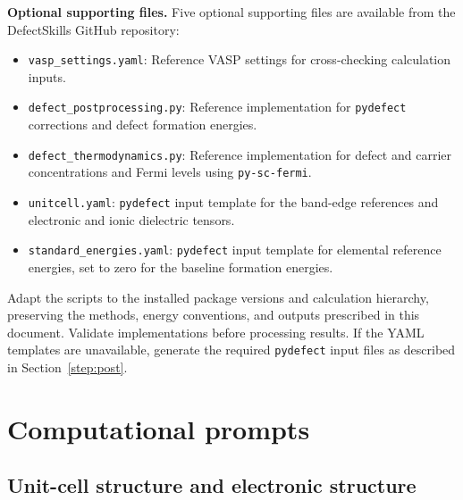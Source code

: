 \documentclass[aip,jap,reprint,amsmath,amssymb]{revtex4-2}
\begin{document}
\textbf{Optional supporting files.} Five optional supporting files are available from the DefectSkills GitHub repository:
\begin{itemize}
    \item \texttt{vasp\_settings.yaml}: Reference VASP settings for cross-checking calculation inputs.
    \item \texttt{defect\_postprocessing.py}: Reference implementation for \texttt{pydefect}\cite{Kumagai2021} corrections and defect formation energies.
    \item \texttt{defect\_thermodynamics.py}: Reference implementation for defect and carrier concentrations and Fermi levels using \texttt{py-sc-fermi}.\cite{Squires2023}
    \item \texttt{unitcell.yaml}: \texttt{pydefect} input template for the band-edge references and electronic and ionic dielectric tensors.
    \item \texttt{standard\_energies.yaml}: \texttt{pydefect} input template for elemental reference energies, set to zero for the baseline formation energies.
\end{itemize}
Adapt the scripts to the installed package versions and calculation hierarchy, preserving the methods, energy conventions, and outputs prescribed in this document. Validate implementations before processing results. If the YAML templates are unavailable, generate the required \texttt{pydefect} input files as described in Section~\ref{step:post}.

\section{Computational prompts}
\renewcommand{\thesubsection}{\arabic{subsection}}

\subsection{Unit-cell structure and electronic structure}\label{step:unitcell}
\end{document}
